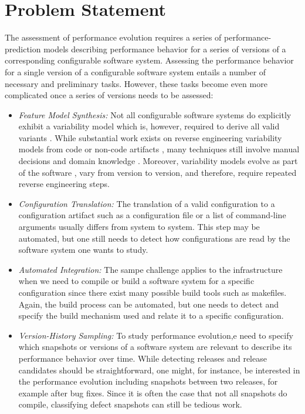 \section{Problem Statement}
The assessment of performance evolution requires a series of
performance-prediction models describing performance behavior for a series of
versions of a corresponding configurable software system. Assessing the
performance behavior for a single version of a configurable software system entails a number of
necessary and preliminary tasks. However, these tasks become even more
complicated once a series of versions needs to be assessed:
\begin{itemize}

  \item \emph{Feature Model Synthesis:} Not all configurable software systems do
  explicitly exhibit a variability model which is, however, required to derive
  all valid variants \citep{rabkin_static_2011,nadi_where_2015}.
	While substantial work exists on reverse engineering variability models from
	code
	\citep{rabkin_static_2011,she_reverse_2011,zhou_extracting_2015,nadi_where_2015}
	 or non-code artifacts
	\citep{alves_exploratory_2008,andersen_efficient_2012,bakar_feature_2015}, many
	techniques still involve manual decisions \citep{she_reverse_2011} and domain
	knowledge \citep{nadi_where_2015}.
	Moreover, variability models evolve as part of the software
	\citep{peng_analyzing_2011}, vary from version to version, and therefore,
	require repeated reverse engineering steps.
	
	\item \emph{Configuration Translation:} The translation of a valid
	configuration to a configuration artifact such as a configuration file or a
	list of command-line arguments usually differs from system to system. This step
	may be automated, but one still needs to detect how configurations are read by the software system one wants to study.

\item \emph{Automated Integration:} The sampe challenge applies to the
infrastructure when we need to compile or build a software system for a specific
configuration since there exist many possible build tools such as makefiles.
Again, the build process can be automated, but one needs to detect and
specify the build mechanism used and relate it to a specific configuration.

\item \emph{Version-History Sampling:} To study performance evolution,e need to
specify which snapshots or versions of a software system are relevant to
describe its performance behavior over time. While detecting releases and release candidates should be straightforward, one might, for instance, be interested in the performance evolution including snapshots
between two releases, for example after bug fixes. Since it is  often the case
that not all snapshots do compile, classifying defect snapshots can still be tedious work.


\end{itemize}
